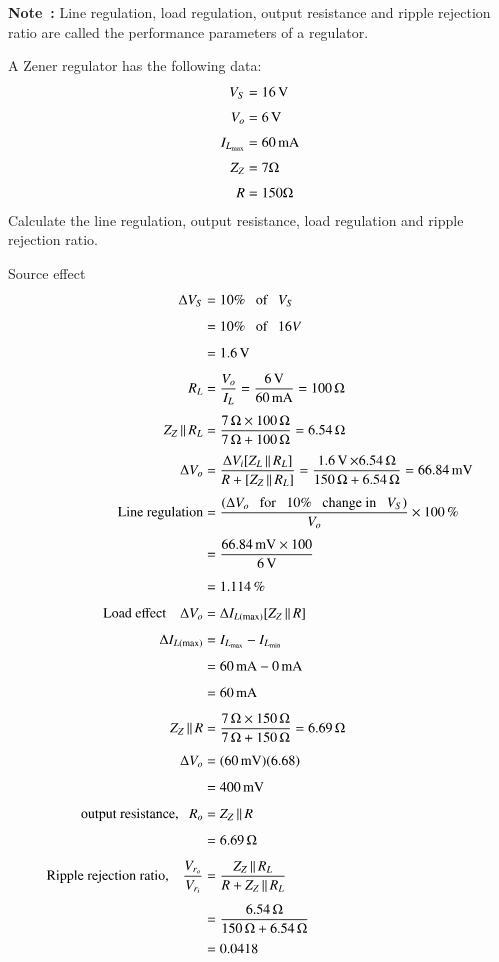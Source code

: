 \eject

\noindent
{\bf Note~:} 
Line regulation, load regulation, output resistance and ripple rejection ratio are called the performance parameters of a regulator.

\begin{example}\label{exam2.35}
A Zener regulator has the following data:
\begin{align*}
V_{S} &= 16\text{\,V}\\[3pt]
V_{o} &= 6\text{\,V}\\[3pt]
I_{L_{\max}} &= 60\text{\,mA}\\[3pt]
Z_{Z} &= 7\Omega\\[3pt]
R &= 150\Omega
\end{align*}
Calculate the line regulation, output resistance, load regulation and ripple rejection ratio.
\end{example}

\begin{solution}
Source effect
\begin{align*}
\Delta V_{S} &= 10\%\text{~~ of~~ } V_{S}\\[4pt]
&= 10\%\text{~~ of~~ }16V\\[4pt]
&= 1.6\text{\,V}\\[4pt]
R_{L} &= \dfrac{V_{o}}{I_{L}}=\dfrac{6\text{\,V}}{60\text{\,mA}}=100\,\Omega\\[4pt]
Z_{Z}\,||\,R_{L} &= \dfrac{7\,\Omega\times 100\,\Omega}{7\,\Omega+100\,\Omega}=6.54\,\Omega\\[4pt]
\Delta V_{o} &= \dfrac{\Delta V_{i}[Z_{L}\,||\,R_{L}]}{R+[Z_{Z}\,||\,R_{L}]}=\dfrac{1.6\operatorname{\mathrm{V}}\times 6.54\,\Omega}{150\,\Omega+6.54\,\Omega}=66.84\text{\,mV}\\[4pt]
\text{Line regulation} &= \dfrac{(\Delta V_{o}\text{~~ for~~ }10\%\text{~~ change in~~ } V_{S})}{V_{o}}\times 100\,\%\\[4pt]
&= \dfrac{66.84\text{\,mV}\times 100}{6\operatorname{\mathrm{V}}}\\[4pt]
&= 1.114\,\%\\[4pt]
\text{Load effect}\quad \Delta V_{o} &= \Delta I_{L(\max)}[Z_{Z}\,||\,R]\\[4pt]
\Delta I_{L(\max)} &= I_{L_{\max}}-I_{L_{\min}}\\[4pt]
&= 60\text{\,mA}-0\text{\,mA}\\[4pt]
&= 60\text{\,mA}\\[4pt]
Z_{Z}\,||\,R &= \dfrac{7\,\Omega\times 150\,\Omega}{7\,\Omega+150\,\Omega}=6.69\,\Omega\\[4pt]
\Delta V_{o} &= (60\,\text{mV})(6.68)\\[4pt]
&= 400\text{\,mV}\\[4pt]
\text{output resistance,}~~~ R_{o} &= Z_{Z}\,||\,R\\[4pt]
&= 6.69\,\Omega\\[4pt]
\text{Ripple rejection ratio,}\quad \dfrac{V_{r_o}}{V_{r_i}} &= \dfrac{Z_{Z}\,||\,R_{L}}{R+Z_{Z}\,||\,R_{L}}\\[4pt]
&= \dfrac{6.54\,\Omega}{150\,\Omega+6.54\,\Omega}\\[2pt]
&= 0.0418
\end{align*}
\vskip -1cm
\end{solution}

